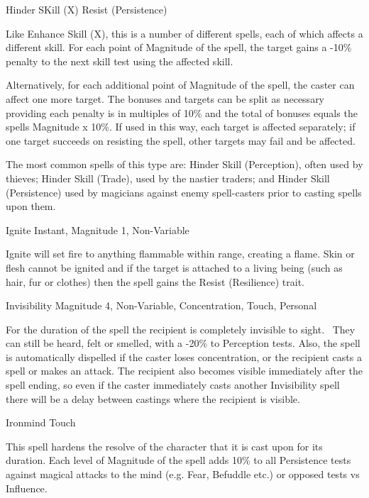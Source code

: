 \begin{rpg-spell}
{Hinder SKill (X)}
{Resist (Persistence)}

Like Enhance Skill (X), this is a number of different spells, each of which affects a different skill. For each point of Magnitude of the spell, the target gains a -10\% penalty to the next skill test using the affected skill.

Alternatively, for each additional point of Magnitude of the spell, the caster can affect one more target.  The bonuses and targets can be split as necessary providing each penalty is in multiples of 10\% and the total of bonuses equals the spells Magnitude x 10\%. If used in this way, each target is affected separately; if one target succeeds on resisting the spell, other targets may fail and be affected.

The most common spells of this type are: Hinder Skill (Perception), often used by thieves; Hinder Skill (Trade), used by the nastier traders; and Hinder Skill (Persistence) used by magicians against enemy spell-casters prior to casting spells upon them.
\end{rpg-spell}


\begin{rpg-spell}
{Ignite}
{Instant, Magnitude 1, Non-Variable}

Ignite will set fire to anything flammable within range, creating a flame. Skin or flesh cannot be ignited and if the target is attached to a living being (such as hair, fur or clothes) then the spell gains the Resist (Resilience) trait. 
\end{rpg-spell}


\begin{rpg-spell}
{Invisibility}
{Magnitude 4, Non-Variable, Concentration, Touch, Personal}

For the duration of the spell the recipient is completely invisible to sight.  They can still be heard, felt or smelled, with a -20\% to Perception tests. Also, the spell is automatically dispelled if the caster loses concentration, or the recipient casts a spell or makes an attack. The recipient also becomes visible immediately after the spell ending, so even if the caster immediately casts another Invisibility spell there will be a delay between castings where the recipient is visible.
\end{rpg-spell}


\begin{rpg-spell}
{Ironmind}
{Touch}

This spell hardens the resolve of the character that it is cast upon for its duration. Each level of Magnitude of the spell adds 10\% to all Persistence tests against magical attacks to the mind (e.g. Fear, Befuddle etc.) or opposed tests vs Influence.
\end{rpg-spell}


